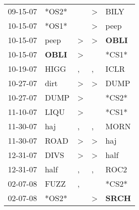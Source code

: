 \begin{supertabular}{p{0.07\textwidth}p{0.06\textwidth}p{0.02\textwidth}p{0.02\textwidth}p{0.06\textwidth}}
          09-15-07\textsuperscript{} &                            *OS2* &                  &     \textgreater &           BILY\textsuperscript{} \\
          10-15-07\textsuperscript{} &                            *OS1* &                  &     \textgreater &           peep\textsuperscript{} \\
          10-15-07\textsuperscript{} &           peep\textsuperscript{} &     \textgreater &     \textgreater &  \textbf{OBLI\textsuperscript{}} \\
          10-15-07\textsuperscript{} &  \textbf{OBLI\textsuperscript{}} &     \textgreater &                  &                            *CS1* \\
          10-19-07\textsuperscript{} &           HIGG\textsuperscript{} &                , &                , &           ICLR\textsuperscript{} \\
          10-27-07\textsuperscript{} &           dirt\textsuperscript{} &     \textgreater &     \textgreater &           DUMP\textsuperscript{} \\
          10-27-07\textsuperscript{} &           DUMP\textsuperscript{} &     \textgreater &                  &                            *CS2* \\
          11-10-07\textsuperscript{} &           LIQU\textsuperscript{} &     \textgreater &                  &                            *CS1* \\
          11-30-07\textsuperscript{} &            haj\textsuperscript{} &                , &                , &           MORN\textsuperscript{} \\
          11-30-07\textsuperscript{} &           ROAD\textsuperscript{} &     \textgreater &     \textgreater &            haj\textsuperscript{} \\
          12-31-07\textsuperscript{} &           DIVS\textsuperscript{} &     \textgreater &     \textgreater &           half\textsuperscript{} \\
          12-31-07\textsuperscript{} &           half\textsuperscript{} &                , &                , &           ROC2\textsuperscript{} \\
          02-07-08\textsuperscript{} &           FUZZ\textsuperscript{} &                , &                  &                            *CS2* \\
          02-07-08\textsuperscript{} &                            *OS2* &                  &     \textgreater &  \textbf{SRCH\textsuperscript{}} \\

\end{supertabular}
